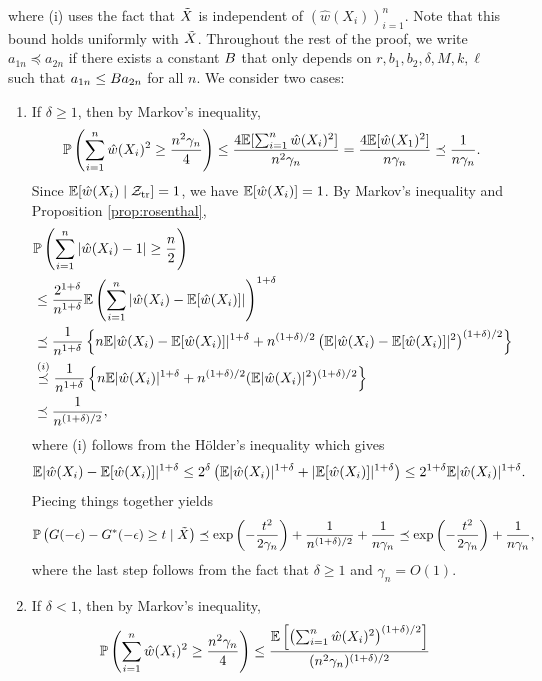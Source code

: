 where (i) uses the fact that $\tilde{X}$ is independent of
$(\hat{w}(X_i))_{i=1}^{n}$. Note that this bound holds uniformly with $\tilde{X}$. Throughout the rest of the proof, we write
$a_{1n}\preceq a_{2n}$ if there exists a constant $B$ that only
depends on $r, b_1, b_2, \delta, M, k, \ell$ such that
$a_{1n}\le B a_{2n}$ for all $n$. We consider two cases:
\begin{enumerate}[(1)]
\item If $\delta \ge 1$, then by Markov's inequality,
  \[\mathbb{P}\left(\sum_{i=1}^{n}\hat{w}(X_i)^2\ge \frac{n^2\gamma_{n}}{4}\right)\le \frac{4\mathbb{E}[\sum_{i=1}^{n}\hat{w}(X_i)^2]}{n^2\gamma_{n}} = \frac{4\mathbb{E}[\hat{w}(X_1)^2]}{n\gamma_{n}}\preceq \frac{1}{n\gamma_{n}}.\]
  Since $\mathbb{E}[\hat{w}(X_i)\mid \mathcal{Z}_{\mathrm{tr}}] = 1$, we have $\mathbb{E}[\hat{w}(X_i)] = 1$. By Markov's inequality and Proposition \ref{prop:rosenthal},
  \begin{align}
    &\mathbb{P}\left( \sum_{i=1}^{n}|\hat{w}(X_i) - 1|\ge \frac{n}{2}\right) \nonumber\\
    & \le \frac{2^{1 + \delta}}{n^{1 + \delta}}\mathbb{E}\left(\sum_{i=1}^{n}|\hat{w}(X_i) - \mathbb{E}[\hat{w}(X_i)]|\right)^{1 + \delta}\nonumber\\
    & \preceq \frac{1}{n^{1 + \delta}}\left\{ n\mathbb{E}|\hat{w}(X_i) - \mathbb{E}[\hat{w}(X_i)]|^{1 + \delta} + n^{(1 + \delta) / 2}\left(\mathbb{E}|\hat{w}(X_i) - \mathbb{E}[\hat{w}(X_i)]|^{2}\right)^{(1 + \delta) / 2}\right\}\nonumber\\
    & \stackrel{(i)}{\preceq} \frac{1}{n^{1 + \delta}}\left\{ n\mathbb{E}|\hat{w}(X_i)|^{1 + \delta} + n^{(1 + \delta) / 2}(\mathbb{E}|\hat{w}(X_i)|^2)^{(1 + \delta) / 2}\right\}\nonumber\\
    & \preceq \frac{1}{n^{(1 + \delta) / 2}},\label{eq:denom_case1}
  \end{align}
  where (i) follows from the H\"{o}lder's
  inequality which gives 
  \[\mathbb{E}|\hat{w}(X_i) - \mathbb{E}[\hat{w}(X_i)]|^{1 + \delta}\le 2^{\delta}\left( \mathbb{E}|\hat{w}(X_i)|^{1+\delta} + |\mathbb{E}[\hat{w}(X_i)]|^{1+\delta}\right)\le 2^{1 + \delta}\mathbb{E}|\hat{w}(X_i)|^{1+\delta}.\]
  Piecing things together yields
  \[\mathbb{P}\left( G(-\epsilon) - G^{*}(-\epsilon) \ge t \mid \tilde{X}\right)\preceq \exp\left( - \frac{t^2}{2\gamma_{n}}\right) + \frac{1}{n^{(1 + \delta) / 2}} + \frac{1}{n\gamma_{n}} \preceq \exp\left( - \frac{t^2}{2\gamma_{n}}\right) + \frac{1}{n\gamma_{n}},\]
  where the last step follows from the fact that $\delta\ge 1$ and $\gamma_{n} = O(1)$.
\item If $\delta < 1$, then by Markov's inequality,
  \begin{align*}
    &\P\lb\sum_{i=1}^{n}\hat{w}(X_i)^2\ge \frac{n^2\gamma_{n}}{4}\rb\le \frac{\E\left[\lb\sum_{i=1}^{n}\hat{w}(X_i)^2\rb^{(1 + \delta) / 2}\right]}{(n^2\gamma_{n})^{(1 + \delta) / 2}}

\end{align*}
\end{enumerate}
